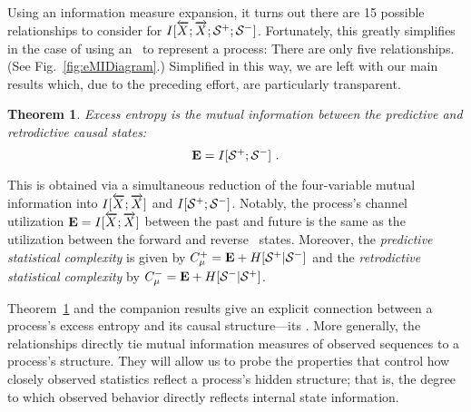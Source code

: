 \documentclass[prl,twocolumn,showpacs,superscriptaddress,preprintnumbers,floatfix]{revtex4}
\theoremstyle{plain}    \newtheorem{Lem}{Lemma}
\theoremstyle{plain}    \newtheorem*{ProLem}{Proof}
\theoremstyle{plain} 	\newtheorem{Cor}{Corollary}
\theoremstyle{plain} 	\newtheorem*{ProCor}{Proof}
\theoremstyle{plain} 	\newtheorem{The}{Theorem}
\theoremstyle{plain} 	\newtheorem*{ProThe}{Proof}
\theoremstyle{plain} 	\newtheorem{Prop}{Proposition}
\theoremstyle{plain} 	\newtheorem*{ProProp}{Proof}
\theoremstyle{plain} 	\newtheorem*{Conj}{Conjecture}
\theoremstyle{plain}	\newtheorem*{Rem}{Remark}
\theoremstyle{plain}	\newtheorem*{Def}{Definition}
\theoremstyle{plain}	\newtheorem*{Not}{Notation}
\begin{document}
Using an information measure expansion, it turns out there are 15 possible
relationships to consider for
$I[\overleftarrow {{X}};\overrightarrow{{X}};{\mathcal{S}}^+;{\mathcal{S}}^-]$. Fortunately,
this greatly simplifies in the case of using an \eM\ to represent
a process: There are only five relationships.
(See Fig.~\ref{fig:eMIDiagram}.)
Simplified in this way, we are left with our main results which, due to the
preceding effort, are particularly transparent.
\begin{The}
Excess entropy is the mutual information between the predictive
and retrodictive causal states:
\vspace{-0.1in}
\begin{equation}
{\bf E} = I[{\mathcal{S}}^+;{\mathcal{S}}^-] ~.
\end{equation}
\label{EasCausalMI}
\end{The}
\vspace{-0.3in}
\noindent
This is obtained via a simultaneous reduction of the four-variable mutual
information into
$I[\overleftarrow {{X}};\overrightarrow{{X}}]$ and $I[{\mathcal{S}}^+;{\mathcal{S}}^-]$.
Notably, the process's channel 
utilization ${\bf E} = I[\overleftarrow {{X}};\overrightarrow{{X}}]$ between
the past and future is the same as the utilization between the forward and 
reverse \eM\ states. Moreover,
the \emph{predictive statistical complexity} is given by
$C_\mu^+ = {\bf E} + H[{\mathcal{S}}^+|{\mathcal{S}}^-]$
and the \emph{retrodictive statistical complexity} by
$C_\mu^- = {\bf E} + H[{\mathcal{S}}^-|{\mathcal{S}}^+]$.

Theorem~\ref{EasCausalMI} and the companion results give an explicit
connection between
a process's excess entropy and its causal structure---its \eMs. More generally,
the relationships directly tie mutual information measures of observed
sequences to a process's structure. They will allow us to probe the properties
that control how closely observed statistics reflect a process's
hidden structure; that is, the degree to which observed behavior directly
reflects internal state information.
\end{document}
